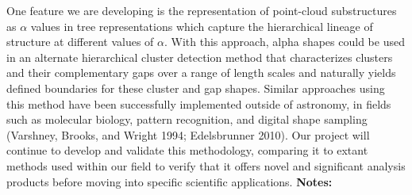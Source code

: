 \documentclass{report}
\begin{document}
{{{{{{{{{{{{{{{{{{{{{{{{{{{{{{{{{{{{{{{{{{{{{{{{{{{{{{{{{{{{{{{{{{{{{{{{{{{{{{{{{{{{{{{{{{{One feature we are developing is the representation of point-cloud substructures as $\alpha$ values in tree representations which capture the hierarchical lineage of structure at different values of $\alpha$. With this approach, alpha shapes could be used in an alternate hierarchical cluster detection method that characterizes clusters and their complementary gaps over a range of length scales and naturally yields defined boundaries for these cluster and gap shapes. Similar approaches using this method have been successfully implemented outside of astronomy, in fields such as molecular biology, pattern recognition, and digital shape sampling (Varshney, Brooks, and Wright 1994; Edelsbrunner 2010). Our project will continue to develop and validate this methodology, comparing it to extant methods used within our field to verify that it offers novel and significant analysis products before moving into specific scientific applications.\newline
{\bf Notes:}\newline
{\newpage
}}}}}}}}}}}}}}}}}}}}}}}}}}}}}}}}}}}}}}}}}}}}}}}}}}}}}}}}}}}}}}}}}}}}}}}}}}}}}}}}}}}}}}}}}}}}
\end{document}
